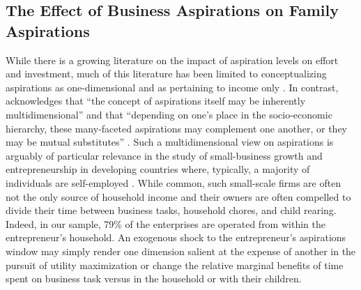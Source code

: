 \documentclass[11.5pt]{article}
\begin{document}

\subsection{The Effect of Business Aspirations on Family Aspirations}

While there is a growing literature on the impact of aspiration levels on effort and investment, much of this literature has been limited to conceptualizing aspirations as one-dimensional and as pertaining to income only \citep[see, e.g.,][]{Janzen2017, McBride2010, Stutzer2004, Knight2012}. In contrast, \citet{Ray2003, Ray2006} acknowledges that ``the concept of aspirations itself may be inherently multidimensional'' and that ``depending on one's place in the socio-economic hierarchy, these many-faceted aspirations may complement one another, or they may be mutual substitutes'' \citep[][p.2]{Ray2003}. Such a multidimensional view on aspirations is arguably of particular relevance in the study of small-business growth and entrepreneurship in developing countries where, typically, a majority of individuals are self-employed \citep[e.g.][]{Maloney2004, Gollin2008, Nichter2009}. While common, such small-scale firms are often not the only source of household income and their owners are often compelled to divide their time between business tasks, household chores, and child rearing. Indeed, in our sample, 79\% of the enterprises are operated from within the entrepreneur's household. An exogenous shock to the entrepreneur's aspirations window may simply render one dimension salient at the expense of another in the pursuit of utility maximization or change the relative marginal benefits of time spent on business task versus in the household or with their children.
\end{document}
